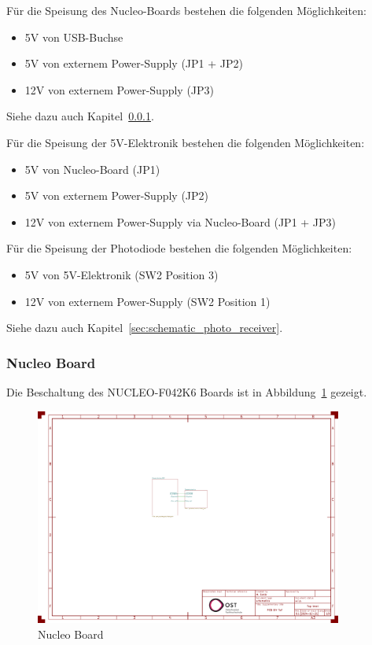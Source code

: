 \documentclass[11pt,a4paper,hidelinks]{article}
\begin{document}
Für die Speisung des Nucleo-Boards bestehen die folgenden Möglichkeiten:

\begin{itemize}
    \item 5V von USB-Buchse
    \item 5V von externem Power-Supply (JP1 + JP2)
    \item 12V von externem Power-Supply (JP3)
\end{itemize}

Siehe dazu auch Kapitel~\ref{sec:schematic_nucleo}.

Für die Speisung der 5V-Elektronik bestehen die folgenden Möglichkeiten:

\begin{itemize}
    \item 5V von Nucleo-Board (JP1)
    \item 5V von externem Power-Supply (JP2)
    \item 12V von externem Power-Supply via Nucleo-Board (JP1 + JP3)
\end{itemize}

Für die Speisung der Photodiode bestehen die folgenden Möglichkeiten:

\begin{itemize}
    \item 5V von 5V-Elektronik (SW2 Position 3)
    \item 12V von externem Power-Supply (SW2 Position 1)
\end{itemize}

Siehe dazu auch Kapitel~\ref{sec:schematic_photo_receiver}.

\subsubsection{Nucleo Board}\label{sec:schematic_nucleo}

Die Beschaltung des NUCLEO-F042K6 Boards \cite{st2024nucleof042k6_usermanual} ist in Abbildung~\ref{fig:nucleo_board} gezeigt.

\begin{figure}[H]
    \centering
    \includegraphics[page=2, trim=530 580 300 50, clip, width=0.9\textwidth]{attachments/schematic.pdf}
    \caption{Nucleo Board}\label{fig:nucleo_board}
\end{figure}
\end{document}
